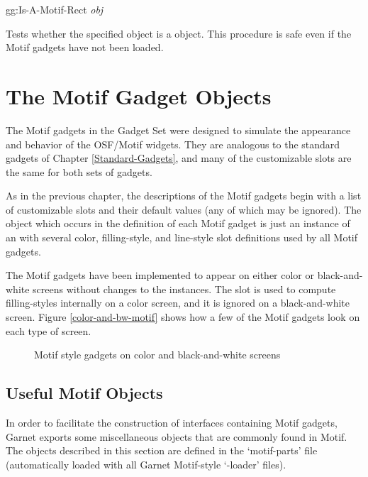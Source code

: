 \begin{programexample}
gg:Is-A-Motif-Rect {\it obj} \value{function}
\end{programexample}
Tests whether the specified object is a  object.
This procedure is safe even if the Motif gadgets have not been loaded.




\chapter{The Motif Gadget Objects}
\label{Motif-Gadgets}

The Motif gadgets in the Gadget Set were designed to simulate the
appearance and behavior of the OSF/Motif widgets.  They are analogous
to the standard gadgets of Chapter \ref{Standard-Gadgets}, and many of
the customizable slots are the same for both sets of gadgets.

As in the previous chapter, the descriptions of the Motif gadgets
begin with a list of customizable slots and their default values (any
of which may be ignored).  The  object which
occurs in the definition of each Motif gadget is just an instance of
an  with several color, filling-style, and line-style
slot definitions used by all Motif gadgets.

The Motif gadgets have been implemented to appear on either color or
black-and-white screens without changes to the instances.
The  slot is used to compute filling-styles internally
on a color screen, and it is ignored on a black-and-white screen.  Figure
\ref{color-and-bw-motif} shows how a few of the Motif gadgets look on each
type of screen.

\begin{figure}
\begin{center}
\end{center}
\caption{Motif style gadgets on color and black-and-white screens}
\end{figure}


\section{Useful Motif Objects}

In order to facilitate the construction of interfaces containing Motif
gadgets, Garnet exports some miscellaneous objects that are commonly
found in Motif.  The objects described in this section are defined in
the `motif-parts' file (automatically loaded with all Garnet Motif-style
`-loader' files).


